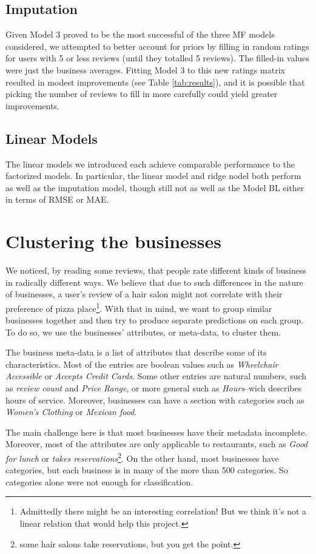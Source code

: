 \documentclass[12pt]{article}
\begin{document}
\subsection{Imputation}  
Given Model 3 proved to be the most successful of the three MF models considered, we attempted to better account for priors by filling in random ratings for users with 5 or less reviews (until they totalled 5 reviews). The filled-in values were just the business averages. Fitting Model 3 to this new ratings matrix resulted in modest improvements (see Table \ref{tab:results}), and it is possible that picking the number of reviews to fill in more carefully could yield greater improvements. 

\subsection{Linear Models}
The linear models we introduced each achieve comparable performance to the factorized models. In particular, the linear model and ridge nodel both perform as well as the imputation model, though still not as well as the Model BL either in terms of RMSE or MAE.

\section{Clustering the businesses}
We noticed, by reading some reviews, that people rate different kinds of business in radically different ways. %
We believe that due to such differences in the nature of businesses, a user's review of a hair salon might not correlate with their preference of pizza place\footnote{Admittedly there might be an interesting correlation! But we think it's not a linear relation that would help this project.}.
With that in mind, we want to group similar businesses together and then try to produce separate predictions on each group. To do so, we use the businesses' attributes, or meta-data, to cluster them.

The business meta-data is a list of attributes that describe some of its characteristics. Most of the entries are boolean values such as \emph{Wheelchair Accessible} or \emph{Accepts Credit Cards}. Some other entries are natural numbers, such as \emph{review count} and \emph{Price Range}, or more general such as \emph{Hours}--wich describes hours of service. Moreover, businesses can have a section with categories such as \emph{Women's Clothing} or \emph{Mexican food}.

The main challenge here is that most businesses have their metadata incomplete. Moreover, most of the attributes are only applicable to restaurants, such as \emph{Good for lunch} or \emph{takes reservations}\footnote{some hair salons take reservations, but you get the point.}. On the other hand, most businesses have categories, but each business is in many of the more than 500 categories. So categories alone were not enough for classification. 
\end{document}
